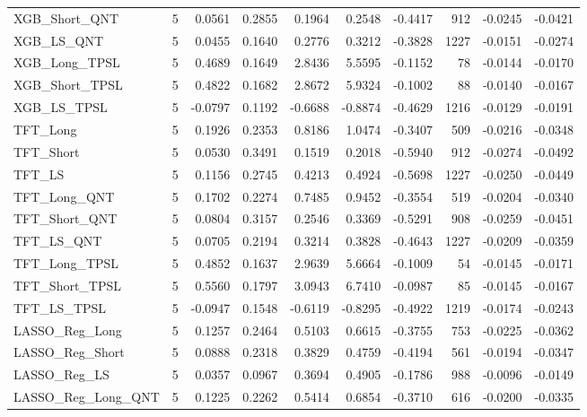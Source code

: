 \begin{tabular}{llrrrrrrrr}
\cline{1-10}
XGB\_Short\_QNT & 5 & 0.0561 & 0.2855 & 0.1964 & 0.2548 & -0.4417 & 912 & -0.0245 & -0.0421 \\
\cline{1-10}
XGB\_LS\_QNT & 5 & 0.0455 & 0.1640 & 0.2776 & 0.3212 & -0.3828 & 1227 & -0.0151 & -0.0274 \\
\cline{1-10}
XGB\_Long\_TPSL & 5 & 0.4689 & 0.1649 & 2.8436 & 5.5595 & -0.1152 & 78 & -0.0144 & -0.0170 \\
\cline{1-10}
XGB\_Short\_TPSL & 5 & 0.4822 & 0.1682 & 2.8672 & 5.9324 & -0.1002 & 88 & -0.0140 & -0.0167 \\
\cline{1-10}
XGB\_LS\_TPSL & 5 & -0.0797 & 0.1192 & -0.6688 & -0.8874 & -0.4629 & 1216 & -0.0129 & -0.0191 \\
\cline{1-10}
TFT\_Long & 5 & 0.1926 & 0.2353 & 0.8186 & 1.0474 & -0.3407 & 509 & -0.0216 & -0.0348 \\
\cline{1-10}
TFT\_Short & 5 & 0.0530 & 0.3491 & 0.1519 & 0.2018 & -0.5940 & 912 & -0.0274 & -0.0492 \\
\cline{1-10}
TFT\_LS & 5 & 0.1156 & 0.2745 & 0.4213 & 0.4924 & -0.5698 & 1227 & -0.0250 & -0.0449 \\
\cline{1-10}
TFT\_Long\_QNT & 5 & 0.1702 & 0.2274 & 0.7485 & 0.9452 & -0.3554 & 519 & -0.0204 & -0.0340 \\
\cline{1-10}
TFT\_Short\_QNT & 5 & 0.0804 & 0.3157 & 0.2546 & 0.3369 & -0.5291 & 908 & -0.0259 & -0.0451 \\
\cline{1-10}
TFT\_LS\_QNT & 5 & 0.0705 & 0.2194 & 0.3214 & 0.3828 & -0.4643 & 1227 & -0.0209 & -0.0359 \\
\cline{1-10}
TFT\_Long\_TPSL & 5 & 0.4852 & 0.1637 & 2.9639 & 5.6664 & -0.1009 & 54 & -0.0145 & -0.0171 \\
\cline{1-10}
TFT\_Short\_TPSL & 5 & 0.5560 & 0.1797 & 3.0943 & 6.7410 & -0.0987 & 85 & -0.0145 & -0.0167 \\
\cline{1-10}
TFT\_LS\_TPSL & 5 & -0.0947 & 0.1548 & -0.6119 & -0.8295 & -0.4922 & 1219 & -0.0174 & -0.0243 \\
\cline{1-10}
LASSO\_Reg\_Long & 5 & 0.1257 & 0.2464 & 0.5103 & 0.6615 & -0.3755 & 753 & -0.0225 & -0.0362 \\
\cline{1-10}
LASSO\_Reg\_Short & 5 & 0.0888 & 0.2318 & 0.3829 & 0.4759 & -0.4194 & 561 & -0.0194 & -0.0347 \\
\cline{1-10}
LASSO\_Reg\_LS & 5 & 0.0357 & 0.0967 & 0.3694 & 0.4905 & -0.1786 & 988 & -0.0096 & -0.0149 \\
\cline{1-10}
LASSO\_Reg\_Long\_QNT & 5 & 0.1225 & 0.2262 & 0.5414 & 0.6854 & -0.3710 & 616 & -0.0200 & -0.0335 \\

\end{tabular}
